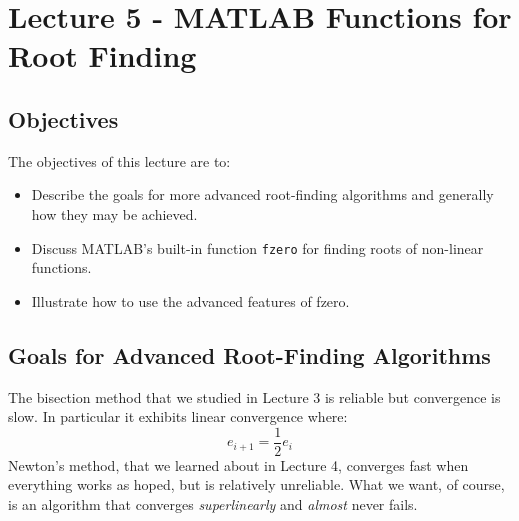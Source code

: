 \chapter{Lecture 5 - MATLAB Functions for Root Finding}
\label{ch:lec5n}
\section{Objectives}
The objectives of this lecture are to:
\begin{itemize}
\item Describe the goals for more advanced root-finding algorithms and generally how they may be achieved.
\item Discuss MATLAB's built-in function \lstinline[style=myMatlab]{fzero} for finding roots of non-linear functions.
\item Illustrate how to use the advanced features of fzero.
\end{itemize}
\setcounter{lstannotation}{0}

\section{Goals for Advanced Root-Finding Algorithms}

The bisection method that we studied in Lecture 3 is reliable but convergence is slow.  In particular it exhibits linear convergence where:
\begin{equation}
e_{i+1} = \frac{1}{2}e_{i}
\end{equation}
Newton's method, that we learned about in Lecture 4, converges fast when everything works as hoped, but is relatively unreliable.  What we want, of course, is an algorithm that converges \emph{superlinearly} and \emph{almost} never fails.

